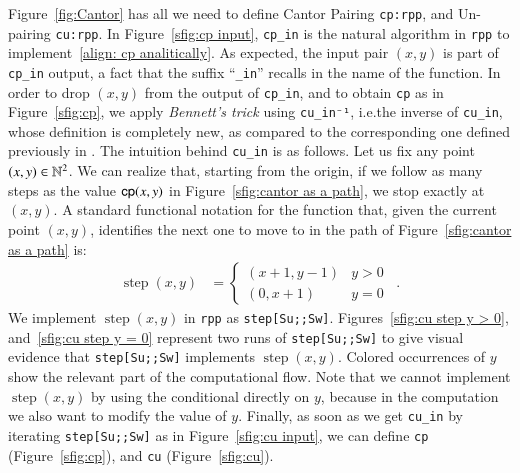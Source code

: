 \documentclass[preprint]{elsarticle}
\theoremstyle{remark}
\begin{document}
Figure~\ref{fig:Cantor} has all we need to define Cantor Pairing \lstinline|cp:rpp|, and Un-pairing \lstinline|cu:rpp|.
In Figure~\ref{sfig:cp input}, \lstinline|cp_in| is the natural algorithm in \lstinline|rpp| to implement~\eqref{align: cp analitically}. As expected, the input pair $(x,y)$ is part of \lstinline|cp_in| output, a fact that the suffix ``\lstinline|_in|'' recalls in the name of the function. In order to drop $(x,y)$ from the output of \lstinline|cp_in|, and to obtain \lstinline|cp| as in Figure~\ref{sfig:cp}, we apply {\it Bennett's trick} using \lstinline|cu_in⁻¹|, i.e.\@ the inverse of \lstinline|cu_in|, whose definition is completely new, as compared to the corresponding one defined previously in \cite{DBLP:journals/tcs/PaoliniPR20}. The intuition behind \lstinline|cu_in| is as follows. Let us fix any point $ (x, y) \in \mathbb{N}^2 $. We can realize that, starting from the origin, if we follow as many steps as the value $ \mathsf{cp}(x, y) $ in Figure~\ref{sfig:cantor as a path}, we stop exactly at $ (x,y) $. A standard functional notation for the function that, given the current point $ (x,y) $, identifies the next one to move to in the path of Figure~\ref{sfig:cantor as a path} is:
\begin{align*}
    \operatorname{step}(x,y) & =
    \begin{cases} (x+1,y-1) &  y > 0 \\ (0, x+1) &   y = 0 \end{cases}
    \enspace .
\end{align*}
We implement $ \operatorname{step}(x,y) $ in \lstinline|rpp| as \lstinline|step[Su;;Sw]|. Figures~\ref{sfig:cu step y > 0}, and~\ref{sfig:cu step y = 0} represent two runs of \lstinline|step[Su;;Sw]| to give visual evidence that \lstinline|step[Su;;Sw]| implements $\operatorname{step}(x,y)$. Colored occurrences of $ y $ show the relevant part of the computational flow. Note that we cannot implement $ \operatorname{step}(x,y) $ by using the conditional directly on $y$, because in the computation we also want to modify the value of $y$. Finally, as soon as we get \lstinline|cu_in| by iterating \lstinline|step[Su;;Sw]| as in Figure~\ref{sfig:cu input}, we can define \lstinline|cp| (Figure~\ref{sfig:cp}), and \lstinline|cu| (Figure~\ref{sfig:cu}).
\end{document}
